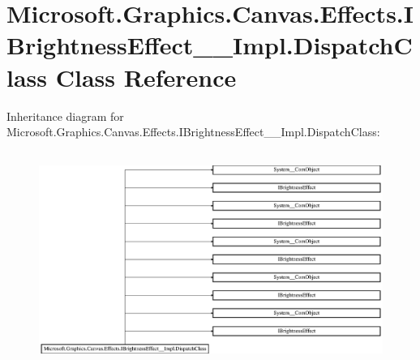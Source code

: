 \hypertarget{class_microsoft_1_1_graphics_1_1_canvas_1_1_effects_1_1_i_brightness_effect_____impl_1_1_dispatch_class}{}\section{Microsoft.\+Graphics.\+Canvas.\+Effects.\+I\+Brightness\+Effect\+\_\+\+\_\+\+Impl.\+Dispatch\+Class Class Reference}
\label{class_microsoft_1_1_graphics_1_1_canvas_1_1_effects_1_1_i_brightness_effect_____impl_1_1_dispatch_class}
Inheritance diagram for Microsoft.\+Graphics.\+Canvas.\+Effects.\+I\+Brightness\+Effect\+\_\+\+\_\+\+Impl.\+Dispatch\+Class\+:\begin{figure}[H]
\begin{center}
\leavevmode
\includegraphics[height=7.048055cm]{class_microsoft_1_1_graphics_1_1_canvas_1_1_effects_1_1_i_brightness_effect_____impl_1_1_dispatch_class}
\end{center}
\end{figure}
